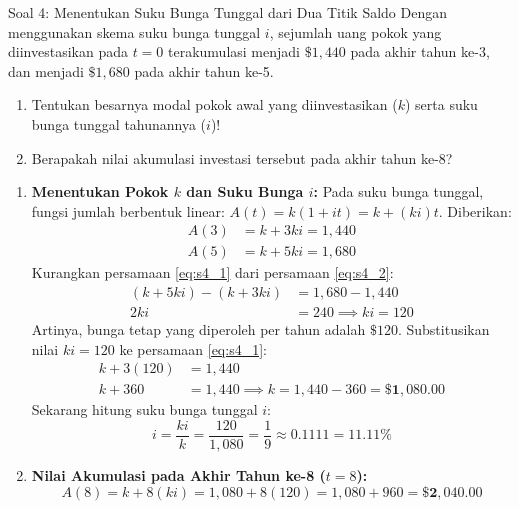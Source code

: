 \documentclass[11pt,a4paper]{article}
\begin{document}
\begin{problembox}{Soal 4: Menentukan Suku Bunga Tunggal dari Dua Titik Saldo}
Dengan menggunakan skema suku bunga tunggal $i$, sejumlah uang pokok yang diinvestasikan pada $t = 0$ terakumulasi menjadi $\$1{,}440$ pada akhir tahun ke-3, dan menjadi $\$1{,}680$ pada akhir tahun ke-5.
\begin{enumerate}[label=(\alph*)]
    \item Tentukan besarnya modal pokok awal yang diinvestasikan ($k$) serta suku bunga tunggal tahunannya ($i$)!
    \item Berapakah nilai akumulasi investasi tersebut pada akhir tahun ke-8?
\end{enumerate}
\end{problembox}

\begin{solutionbox}[Soal 4]
\begin{enumerate}[label=(\alph*)]
    \item \textbf{Menentukan Pokok $k$ dan Suku Bunga $i$:}
    Pada suku bunga tunggal, fungsi jumlah berbentuk linear: $A(t) = k(1 + it) = k + (ki)t$.
    Diberikan:
    \begin{align}
        A(3) &= k + 3ki = 1{,}440 \label{eq:s4_1} \\
        A(5) &= k + 5ki = 1{,}680 \label{eq:s4_2}
    \end{align}
    Kurangkan persamaan \eqref{eq:s4_1} dari persamaan \eqref{eq:s4_2}:
    \begin{align*}
        (k + 5ki) - (k + 3ki) &= 1{,}680 - 1{,}440 \\
        2ki &= 240 \implies ki = 120
    \end{align*}
    Artinya, bunga tetap yang diperoleh per tahun adalah $\$120$.
    Substitusikan nilai $ki = 120$ ke persamaan \eqref{eq:s4_1}:
    \begin{align*}
        k + 3(120) &= 1{,}440 \\
        k + 360 &= 1{,}440 \implies k = 1{,}440 - 360 = \mathbf{\$1{,}080.00}
    \end{align*}
    Sekarang hitung suku bunga tunggal $i$:
    \begin{equation*}
        i = \frac{ki}{k} = \frac{120}{1{,}080} = \frac{1}{9} \approx 0.1111 = \mathbf{11.11\%}
    \end{equation*}

    \item \textbf{Nilai Akumulasi pada Akhir Tahun ke-8 ($t = 8$):}
    \begin{equation*}
        A(8) = k + 8(ki) = 1{,}080 + 8(120) = 1{,}080 + 960 = \mathbf{\$2{,}040.00}
    \end{equation*}
\end{enumerate}
\end{solutionbox}
\end{document}

